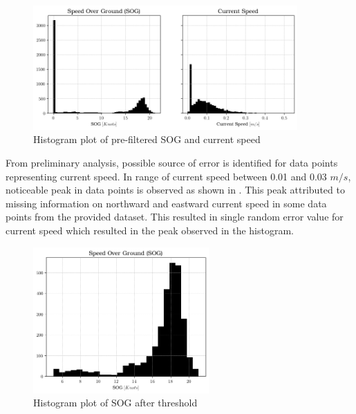 \begin{figure}[h!]
    \centering
        \includegraphics[width=0.9\textwidth]{02_figures/sog_curspeed_anomalies.png}
        \caption{Histogram plot of pre-filtered SOG and current speed}
        \label{fig:anomalies_sog_curspeed}
\end{figure}

From preliminary analysis, possible source of error is identified for data points representing current speed. In range of current speed between 0.01 and 0.03 $m/s$, noticeable peak in data points is observed as shown in . This peak attributed to missing information on northward and eastward current speed in some data points from the provided dataset. This resulted in single random error value for current speed which resulted in the peak observed in the histogram.\\ 

\begin{figure}[h]
    \centering
        \includegraphics[width=0.6\textwidth]{02_figures/hist_init_sog_postfilter.png}
        \caption{Histogram plot of SOG after threshold}
        \label{fig:SOG_greater_five}
\end{figure}

